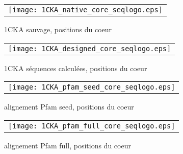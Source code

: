     \begin{figure}[h]
      \centering
      \begin{tabular}{c} 
        \texttt{[image: 1CKA\_native\_core\_seqlogo.eps]} \\
      \end{tabular}
        
      \caption{1CKA sauvage, positions du coeur}
\label{}
    \end{figure}

    \begin{figure}[h]
      \centering
      \begin{tabular}{c} 
        \texttt{[image: 1CKA\_designed\_core\_seqlogo.eps]} \\
      \end{tabular}
        
      \caption{1CKA séquences calculées, positions du coeur}
\label{}
    \end{figure}

    \begin{figure}[h]
      \centering
      \begin{tabular}{c} 
        \texttt{[image: 1CKA\_pfam\_seed\_core\_seqlogo.eps]} \\
      \end{tabular}
        
      \caption{alignement Pfam seed, positions du coeur}
\label{}
    \end{figure}

    \begin{figure}[h]
      \centering
      \begin{tabular}{c} 
        \texttt{[image: 1CKA\_pfam\_full\_core\_seqlogo.eps]} \\
      \end{tabular}
        
      \caption{alignement Pfam full, positions du coeur}
\label{}
    \end{figure}

    \clearpage



